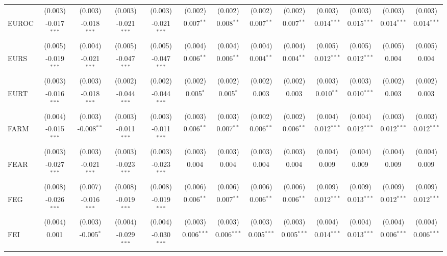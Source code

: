 \begin{table}[!htbp]
\begin{tabular}{@{\extracolsep{5pt}}lcccccccccccc}
  & (0.003) & (0.003) & (0.003) & (0.003) & (0.002) & (0.002) & (0.002) & (0.002) & (0.003) & (0.003) & (0.003) & (0.003) \\
 EUROC & -0.017$^{***}$ & -0.018$^{***}$ & -0.021$^{***}$ & -0.021$^{***}$ & 0.007$^{**}$ & 0.008$^{**}$ & 0.007$^{**}$ & 0.007$^{**}$ & 0.014$^{***}$ & 0.015$^{***}$ & 0.014$^{***}$ & 0.014$^{***}$ \\
  & (0.005) & (0.004) & (0.005) & (0.005) & (0.004) & (0.004) & (0.004) & (0.004) & (0.005) & (0.005) & (0.005) & (0.005) \\
 EURS & -0.019$^{***}$ & -0.021$^{***}$ & -0.047$^{***}$ & -0.047$^{***}$ & 0.006$^{**}$ & 0.006$^{**}$ & 0.004$^{**}$ & 0.004$^{**}$ & 0.012$^{***}$ & 0.012$^{***}$ & 0.004$^{}$ & 0.004$^{}$ \\
  & (0.003) & (0.003) & (0.002) & (0.002) & (0.002) & (0.002) & (0.002) & (0.002) & (0.003) & (0.003) & (0.002) & (0.002) \\
 EURT & -0.016$^{***}$ & -0.018$^{***}$ & -0.044$^{***}$ & -0.044$^{***}$ & 0.005$^{*}$ & 0.005$^{*}$ & 0.003$^{}$ & 0.003$^{}$ & 0.010$^{**}$ & 0.010$^{***}$ & 0.003$^{}$ & 0.003$^{}$ \\
  & (0.004) & (0.003) & (0.003) & (0.003) & (0.003) & (0.003) & (0.002) & (0.002) & (0.004) & (0.004) & (0.003) & (0.003) \\
 FARM & -0.015$^{***}$ & -0.008$^{**}$ & -0.011$^{***}$ & -0.011$^{***}$ & 0.006$^{**}$ & 0.007$^{**}$ & 0.006$^{**}$ & 0.006$^{**}$ & 0.012$^{***}$ & 0.012$^{***}$ & 0.012$^{***}$ & 0.012$^{***}$ \\
  & (0.003) & (0.003) & (0.003) & (0.003) & (0.003) & (0.003) & (0.003) & (0.003) & (0.004) & (0.004) & (0.004) & (0.004) \\
 FEAR & -0.027$^{***}$ & -0.021$^{***}$ & -0.023$^{***}$ & -0.023$^{***}$ & 0.004$^{}$ & 0.004$^{}$ & 0.004$^{}$ & 0.004$^{}$ & 0.009$^{}$ & 0.009$^{}$ & 0.009$^{}$ & 0.009$^{}$ \\
  & (0.008) & (0.007) & (0.008) & (0.008) & (0.006) & (0.006) & (0.006) & (0.006) & (0.009) & (0.009) & (0.009) & (0.009) \\
 FEG & -0.026$^{***}$ & -0.016$^{***}$ & -0.019$^{***}$ & -0.019$^{***}$ & 0.006$^{**}$ & 0.007$^{**}$ & 0.006$^{**}$ & 0.006$^{**}$ & 0.012$^{***}$ & 0.013$^{***}$ & 0.012$^{***}$ & 0.012$^{***}$ \\
  & (0.004) & (0.003) & (0.004) & (0.004) & (0.003) & (0.003) & (0.003) & (0.003) & (0.004) & (0.004) & (0.004) & (0.004) \\
 FEI & 0.001$^{}$ & -0.005$^{*}$ & -0.029$^{***}$ & -0.030$^{***}$ & 0.006$^{***}$ & 0.006$^{***}$ & 0.005$^{***}$ & 0.005$^{***}$ & 0.014$^{***}$ & 0.013$^{***}$ & 0.006$^{***}$ & 0.006$^{***}$ \\

\end{tabular}
\end{table}
